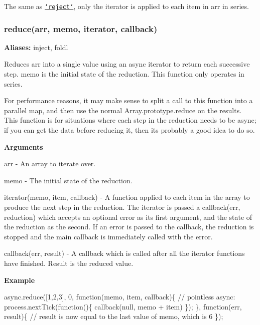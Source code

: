 The same as \href{#reject}{\tt `reject`}, only the {\ttfamily iterator} is applied to each item in {\ttfamily arr} in series.





\label{_reduce}%
 \subsubsection*{reduce(arr, memo, iterator, callback)}

{\bfseries Aliases\+:} {\ttfamily inject}, {\ttfamily foldl}

Reduces {\ttfamily arr} into a single value using an async {\ttfamily iterator} to return each successive step. {\ttfamily memo} is the initial state of the reduction. This function only operates in series.

For performance reasons, it may make sense to split a call to this function into a parallel map, and then use the normal {\ttfamily Array.\+prototype.\+reduce} on the results. This function is for situations where each step in the reduction needs to be async; if you can get the data before reducing it, then it\textquotesingle{}s probably a good idea to do so.

{\bfseries Arguments}


\begin{DoxyItemize}
\item {\ttfamily arr} -\/ An array to iterate over.
\item {\ttfamily memo} -\/ The initial state of the reduction.
\item {\ttfamily iterator(memo, item, callback)} -\/ A function applied to each item in the array to produce the next step in the reduction. The {\ttfamily iterator} is passed a {\ttfamily callback(err, reduction)} which accepts an optional error as its first argument, and the state of the reduction as the second. If an error is passed to the callback, the reduction is stopped and the main {\ttfamily callback} is immediately called with the error.
\item {\ttfamily callback(err, result)} -\/ A callback which is called after all the {\ttfamily iterator} functions have finished. Result is the reduced value.
\end{DoxyItemize}

{\bfseries Example}


\begin{DoxyCode}
async.reduce([1,2,3], 0, \textcolor{keyword}{function}(memo, item, callback)\{
    \textcolor{comment}{// pointless async:}
    process.nextTick(\textcolor{keyword}{function}()\{
        callback(null, memo + item)
    \});
\}, \textcolor{keyword}{function}(err, result)\{
    \textcolor{comment}{// result is now equal to the last value of memo, which is 6}
\});
\end{DoxyCode}
 



